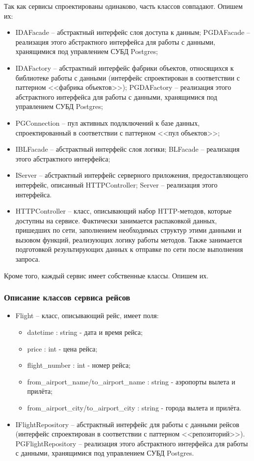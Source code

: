 Так как сервисы спроектированы одинаково, часть классов совпадают. Опишем их:
\begin{itemize}
    \item IDAFacade -- абстрактный интерфейс слоя доступа к данным; PGDAFacade -- реализация этого абстрактного интерфейса для работы с данными, хранящимися под управлением СУБД Postgres;
    \item IDAFactory -- абстрактный интерфейс фабрики объектов, относящихся к библиотеке работы с данными (интерфейс спроектирован в соответствии с паттерном <<фабрика объектов>>); PGDAFactory -- реализация этого абстрактного интерфейса для работы с данными, хранящимися под управлением СУБД Postgres;
    \item PGConnection -- пул активных подлключений к базе данных, спроектированный в соответствии с паттерном <<пул объектов>>;
    \item IBLFacade -- абстрактный интерфейс слоя логики; BLFacade -- реализация этого абстрактного интерфейса;
    \item IServer -- абстрактный интерфейс серверного приложения, предоставляющего интерфейс, описанный HTTPController; Server -- реализация этого интерфейса.
    \item HTTPController -- класс, описывающий набор  HTTP-методов, которые доступны на сервисе. Фактически занимается распаковкой данных, пришедших по сети, заполнением необходимых структур этими данными и вызовом функций, реализующих логику работы методов. Также занимается подготовкой результирующих данных к отправке по сети после выполнения запроса. 
\end{itemize}

Кроме того, каждый сервис имеет собственные классы. Опишем их.

\subsubsection{Описание классов сервиса рейсов}

\begin{itemize}
    \item Flight -- класс, описывающий рейс, имеет поля:
    \begin{itemize}
        \item datetime : string - дата и время рейса;
        \item price : int - цена рейса;
        \item flight\_number : int - номер рейса;
        \item from\_airport\_name/to\_airport\_name : string - аэропорты вылета и прилёта;
        \item from\_airport\_city/to\_airport\_city : string - города вылета и прилёта.
    \end{itemize}
    \item IFlightRepository -- абстрактный интерфейс для работы с данными рейсов (интерфейс спроектирован в соответствии с паттерном <<репозиторий>>). PGFlightRepository -- реализация этого абстрактного интерфейса для работы с данными, хранящимися под управлением СУБД Postgres.
\end{itemize}

